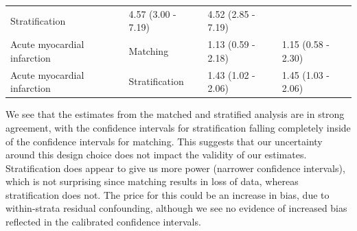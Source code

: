 \documentclass[11pt]{book}
\theoremstyle{definition}
\theoremstyle{definition}
\theoremstyle{definition}
\theoremstyle{remark}
\begin{document}
\begin{longtable}[]{@{}llll@{}}
\begin{minipage}[t]{0.15\columnwidth}
Stratification\strut
\end{minipage} & \begin{minipage}[t]{0.17\columnwidth}\raggedright\strut
4.57 (3.00 - 7.19)\strut
\end{minipage} & \begin{minipage}[t]{0.17\columnwidth}\raggedright\strut
4.52 (2.85 - 7.19)\strut
\end{minipage}\tabularnewline
\begin{minipage}[t]{0.27\columnwidth}\raggedright\strut
Acute myocardial infarction\strut
\end{minipage} & \begin{minipage}[t]{0.15\columnwidth}\raggedright\strut
Matching\strut
\end{minipage} & \begin{minipage}[t]{0.17\columnwidth}\raggedright\strut
1.13 (0.59 - 2.18)\strut
\end{minipage} & \begin{minipage}[t]{0.17\columnwidth}\raggedright\strut
1.15 (0.58 - 2.30)\strut
\end{minipage}\tabularnewline
\begin{minipage}[t]{0.27\columnwidth}\raggedright\strut
Acute myocardial infarction\strut
\end{minipage} & \begin{minipage}[t]{0.15\columnwidth}\raggedright\strut
Stratification\strut
\end{minipage} & \begin{minipage}[t]{0.17\columnwidth}\raggedright\strut
1.43 (1.02 - 2.06)\strut
\end{minipage} & \begin{minipage}[t]{0.17\columnwidth}\raggedright\strut
1.45 (1.03 - 2.06)\strut
\end{minipage}\tabularnewline
\bottomrule
\end{longtable}

We see that the estimates from the matched and stratified analysis are
in strong agreement, with the confidence intervals for stratification
falling completely inside of the confidence intervals for matching. This
suggests that our uncertainty around this design choice does not impact
the validity of our estimates. Stratification does appear to give us
more power (narrower confidence intervals), which is not surprising
since matching results in loss of data, whereas stratification does not.
The price for this could be an increase in bias, due to within-strata
residual confounding, although we see no evidence of increased bias
reflected in the calibrated confidence intervals.
\end{document}
